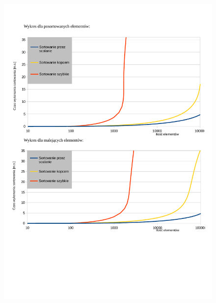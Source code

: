 \documentclass{article}
\begin{document}
\begin{flushleft}
\begin{figure}[H]
\includegraphics[width=\textwidth]{sort_czas2.pdf}
\label{fig:sort_czas2.pdf}
\end{figure}
\end{flushleft}
\end{document}
